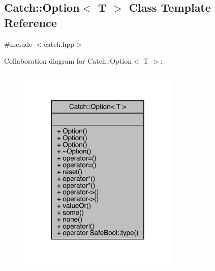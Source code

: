 \hypertarget{a00063}{}\subsection{Catch\+:\+:Option$<$ T $>$ Class Template Reference}
\label{a00063}


{\ttfamily \#include $<$catch.\+hpp$>$}



Collaboration diagram for Catch\+:\+:Option$<$ T $>$\+:\nopagebreak
\begin{figure}[H]
\begin{center}
\leavevmode
\includegraphics[width=216pt]{a00243}
\end{center}
\end{figure}
